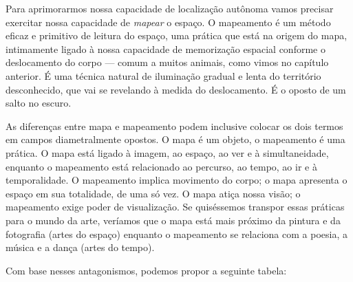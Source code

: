 Para aprimorarmos nossa capacidade de localização autônoma vamos
precisar exercitar nossa capacidade de \emph{mapear} o espaço. O
mapeamento é um método eficaz e primitivo de leitura do espaço, uma
prática que está na origem do mapa, intimamente ligado à nossa
capacidade de memorização espacial conforme o deslocamento do corpo ---
comum a muitos animais, como vimos no capítulo anterior. É uma técnica
natural de iluminação gradual e lenta do território desconhecido, que
vai se revelando à medida do deslocamento. É o oposto de um salto no
escuro.

As diferenças entre mapa e mapeamento podem inclusive colocar os dois
termos em campos diametralmente opostos. O mapa é um objeto, o
mapeamento é uma prática. O mapa está ligado à imagem, ao espaço, ao ver
e à simultaneidade, enquanto o mapeamento está relacionado ao percurso,
ao tempo, ao ir e à temporalidade. O mapeamento implica movimento do
corpo; o mapa apresenta o espaço em sua totalidade, de uma só vez. O
mapa atiça nossa visão; o mapeamento exige poder de visualização. Se
quiséssemos transpor essas práticas para o mundo da arte, veríamos que o
mapa está mais próximo da pintura e da fotografia (artes do espaço)
enquanto o mapeamento se relaciona com a poesia, a música e a dança
(artes do tempo).

Com base nesses antagonismos, podemos propor a seguinte tabela:

